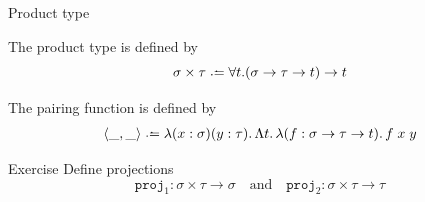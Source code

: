 \begin{frame}{Product type}
\begin{definition}
  The product type is defined by
  \[
    \sigma \times \tau \defeq \forall t. (\sigma \to \tau \to t) \to t
  \]
\end{definition}
The pairing function is defined by
\begin{align*}
  \left< \_, \_\right> \defeq \lambda (x : \sigma)(y : \tau).\,\Lambda t.\,\lambda (f : \sigma \to \tau \to t).\,
  f\;x\;y
\end{align*}
\begin{block}{Exercise}
Define projections 
\[
  \mathtt{proj}_1 : \sigma \times \tau \to \sigma
  \quad\text{and}\quad
  \mathtt{proj}_2 : \sigma\times \tau \to \tau
\]
\end{block}
\end{frame}
